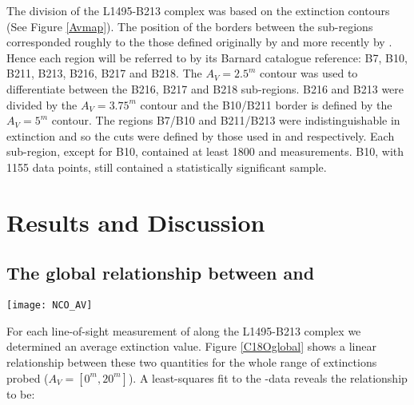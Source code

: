 \documentclass{aa}
\begin{document}
The division of the L1495-B213 complex was based on the extinction contours (See Figure \ref{Avmap}). The position of the borders between the sub-regions corresponded roughly to the those defined originally by \citet{barnard27} and more recently by \citet{schmalzl10}. Hence each region will be referred to by its Barnard catalogue reference: B7, B10, B211, B213, B216, B217 and B218. The $A_V=2.5^m$ contour was used to differentiate between the B216, B217 and B218 sub-regions. B216 and B213 were divided by the $A_V=3.75^m$ contour and the B10/B211 border is defined by the $A_V=5^m$ contour. The regions B7/B10 and B211/B213 were indistinguishable in extinction and so the cuts were defined by those used in \citet{schmalzl10} and \citet{hacar13} respectively. Each sub-region, except for B10, contained at least 1800 \eco and \av measurements. B10, with 1155 data points, still contained a statistically significant sample.


\section{Results and Discussion}

\subsection{The global relationship between \eco and \av}

    \begin{figure*}
    \centering
    \texttt{[image: NCO\_AV]}
    \caption{The global relationship between \neco and \av for the L1495-B213 complex. The broad grey region represents the area between the linear least-squares fits applied to the data along each axis. The solid red line is the average of these best-fits. The nominal uncertainty in the \neco measurements is     [***fill in error***].     The uncertainty in the extinction measurements averaged 7\% and never exceed 20\% for areas where $A_V>2^m$. Errorbars have been omitted in this figure in order to better display the $\approx$ 14600 data points. The colourful region shows the density of points in bins of size ($d$\av, $d$\neco)=($0.1^m$, $0.2\times 10^14$ cm$^{-2}$).}
    \label{C18Oglobal}
    \end{figure*}

For each line-of-sight measurement of \neco along the L1495-B213 complex we determined an average extinction value. Figure \ref{C18Oglobal} shows a linear relationship between these two quantities for the whole range of extinctions probed ($A_V=[0^m, 20^m]$). A least-squares fit to the \neco-\av data reveals the relationship to be:
\end{document}
